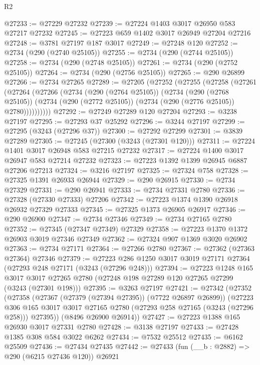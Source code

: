 \begin{lexlean}{R2}
\begin{coremodule}
@27233 := @27229 @27232
@27239 := @27224 @1403 @3017 @26950 @583 @27217 @27232
@27245 := @27223 @659 @1402 @3017 @26949 @27204 @27216
@27248 := @3781 @27197 @187 @3017
@27249 := @27248 @120
@27252 := @2734 (@290 (@2740 @25105))
@27255 := @2734 (@290 (@2744 @25105))
@27258 := @2734 (@290 (@2748 @25105))
@27261 := @2734 (@290 (@2752 @25105))
@27264 := @2734 (@290 (@2756 @25105))
@27265 := @290 @26899
@27266 := @2734 @27265
@27289 := @27205
    (@27252
      (@27255
        (@27258
          (@27261
            (@27264
              (@27266
                (@2734
                  (@290 (@2764 @25105))
                  (@2734
                    (@290 (@2768 @25105))
                    (@2734 (@290 (@2772 @25105)) (@2734 (@290 (@2776 @25105)) @2780))))))))))
@27292 := @27249 @27289 @120 @27204
@27293 := @3238 @27197
@27295 := @27293 @37 @25292
@27296 := @3244 @27197
@27299 := @27295 (@3243 (@27296 @37))
@27300 := @27292 @27299
@27301 := @3839 @27289
@27305 := @27245 (@27300 (@3243 (@27301 @120)))
@27311 := @27224 @1401 @3017 @26948 @583 @27215 @27232
@27317 := @27224 @1400 @3017 @26947 @583 @27214 @27232
@27323 := @27223 @1392 @1399 @26945 @6887 @27206 @27213
@27324 := @3216 @27197
@27325 := @27324 @758
@27328 := @27325 @1391 @26933 @26944
@27329 := @290 @26915
@27330 := @2734 @27329
@27331 := @290 @26941
@27333 := @2734 @27331 @2780
@27336 := @27328 (@27330 @27333) @27206
@27342 := @27223 @1374 @1390 @26918 @26932 @27329 @27333
@27345 := @27325 @1373 @26905 @26917
@27346 := @290 @26900
@27347 := @2734 @27346
@27349 := @2734 @27165 @2780
@27352 := @27345 (@27347 @27349) @27329
@27358 := @27223 @1370 @1372 @26903 @3019 @27346 @27349
@27362 := @27324 @907 @1369 @3020 @26902
@27363 := @2734 @27171
@27364 := @27266 @2780
@27367 := @27362 (@27363 @27364) @27346
@27379 := @27223 @286 @1250 @3017 @3019 @27171 @27364 (@27293 @248 @27171 (@3243 (@27296 @248)))
@27394 := @27223
    @1248
    @165
    @3017
    @3017
    @27265
    @2780
    (@27248 @198 @27289 @120 @27265 @27299 (@3243 (@27301 @198)))
@27395 := @3263 @27197
@27421 := @27342
    (@27352
      (@27358
        (@27367 (@27379 (@27394 @27395)) (@7722 @26897 @26899))
        (@27223
          @306
          @165
          @3017
          @3017
          @27165
          @2780
          (@27293 @258 @27165 (@3243 (@27296 @258)))
          @27395))
      (@8496 @26900 @26914))
@27427 := @27223 @1388 @165 @26930 @3017 @27331 @2780
@27428 := @3138 @27197
@27433 := @27428 @1385 @308 @584 @3022 @6262
@27434 := @7532 @25512
@27435 := @6162 @25509
@27436 := @27434 @27435
@27442 := @27433 (fun (__b : @2882) => @290 (@6215 @27436 @120)) @26921

\end{coremodule}
\end{lexlean}
